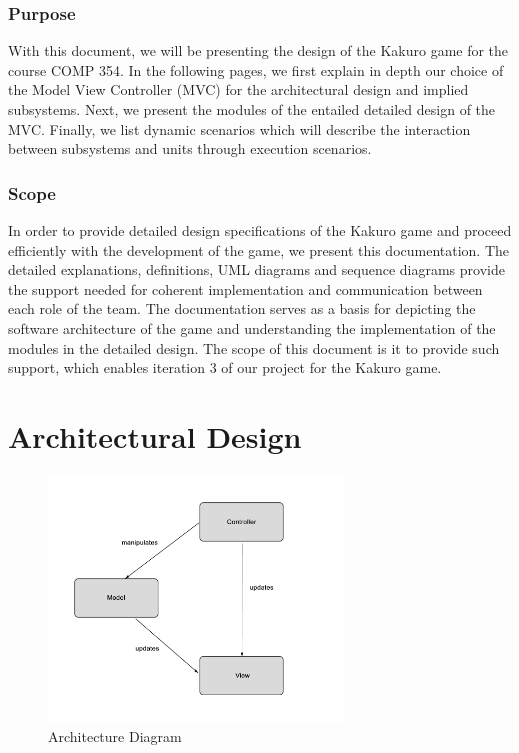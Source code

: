 \documentclass[12pt]{article}
\begin{document}
\subsubsection{Purpose}
With this document, we will be presenting the design of the Kakuro game for the course COMP 354. In the following pages, we first explain in depth our choice of the Model View Controller (MVC) for the architectural design and implied subsystems. Next, we present the modules of the entailed detailed design of the MVC. Finally, we list dynamic scenarios which will describe the interaction between subsystems and units through execution scenarios.

\subsubsection{Scope}
In order to provide detailed design specifications of the Kakuro game and proceed efficiently with the development of the game, we present this documentation. The detailed explanations, definitions, UML diagrams and sequence diagrams provide the support needed for coherent implementation and communication between each role of the team. The documentation serves as a basis for depicting the software architecture of the game and understanding the implementation of the modules in the detailed design. The scope of this document is it to provide such support, which enables iteration 3 of our project for the Kakuro game.

\newpage

\section{Architectural Design} \label{sec:arch}




\begin{figure}[htbp]
    \includegraphics[width=0.7\textwidth]{MVC_part2}
    \caption{Architecture Diagram}
    \label{fig:archi_diagram}
\end{figure}
\end{document}
